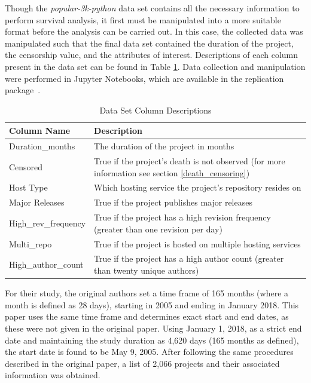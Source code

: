 \documentclass[sigconf]{acmart}
\begin{document}
Though the \emph{popular-3k-python} data set contains all the necessary information to perform survival analysis, it first must be manipulated into a more suitable format before the analysis can be carried out. 
In this case, the collected data was manipulated such that the final data set contained the duration of the project, the censorship value, and the attributes of interest. 
Descriptions of each column present in the data set can be found in Table \ref{tab:data}. 
Data collection and manipulation were performed in Jupyter Notebooks, which are available in the replication package~\cite{repl-package}.

\begin{table}
    \caption{Data Set Column Descriptions}
    \label{tab:data}
    \begin{tabular}{ll}
        \toprule
        Column Name & Description \\
        \midrule
        Duration\_months     & The duration of the project in months \\
        Censored             & True if the project's death is not observed (for more information see section \ref{death_censoring}) \\
        Host Type            & Which hosting service the project's repository resides on \\
        Major Releases       & True if the project publishes major releases \\
        High\_rev\_frequency & True if the project has a high revision frequency (greater than one revision per day) \\
        Multi\_repo          & True if the project is hosted on multiple hosting services\\
        High\_author\_count  & True if the project has a high author count (greater than twenty unique authors) \\
        \bottomrule
    \end{tabular}
\end{table}

For their study, the original authors set a time frame of 165 months (where a month is defined as 28 days), starting in 2005 and ending in January 2018.
This paper uses the same time frame and determines exact start and end dates, as these were not given in the original paper.
Using January 1, 2018, as a strict end date and maintaining the study duration as 4,620 days (165 months as defined), the start date is found to be May 9, 2005.
After following the same procedures described in the original paper, a list of 2,066 projects and their associated information was obtained.
\end{document}
